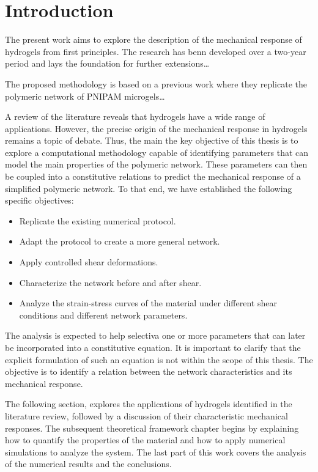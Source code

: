 \chapter{Introduction}\label{ch1:Intro}



The present work aims to explore the description of the mechanical response of hydrogels from first principles.
The research has benn developed over a two-year period and lays the foundation for further extensions\ldots

The proposed methodology is based on a previous work where they replicate the polymeric network of PNIPAM microgels\ldots 


A review of the literature reveals that hydrogels have a wide range of applications.
However, the precise origin of the mechanical response in hydrogels remains a topic of debate.
Thus, the main the key objective of this thesis is to explore a computational methodology capable of identifying parameters that can model the main properties of the polymeric network. 
These parameters can then be coupled into a constitutive relations to predict the mechanical response of a simplified polymeric network.
To that end, we have established the following specific objectives:
\begin{itemize}
    \item Replicate the existing numerical protocol.
    \item Adapt the protocol to create a more general network.
    \item Apply controlled shear deformations.
    \item Characterize the network before and after shear.
    \item Analyze the strain-stress curves of the material under different shear conditions and different network parameters.
\end{itemize}
The analysis is expected to help selectiva one or more parameters that can later be incorporated into a constitutive equation.
It is important to clarify that the explicit formulation of such an equation is not within the scope of this thesis. 
The objective is to identify a relation between the network characteristics and its mechanical response.

The following section, explores the applications of hydrogels identified in the literature review, followed by a discussion of their characteristic mechanical responses.
The subsequent theoretical framework chapter begins by explaining how to quantify the properties of the material and how to apply numerical simulations to analyze the system.
The last part of this work covers the analysis of the numerical results and the conclusions.

